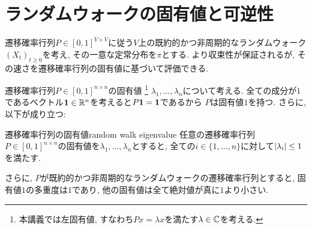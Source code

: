 \section{ランダムウォークの固有値と可逆性}
遷移確率行列$P \in [0,1]^{V \times V}$に従う$V$上の既約的かつ非周期的なランダムウォーク$(X_t)_{t\ge 0}$を考え,
その一意な定常分布を$\pi$とする.
より収束性が保証されるが, その速さを遷移確率行列の固有値に基づいて評価できる.

遷移確率行列$P \in [0,1]^{n \times n}$の固有値
\footnote{本講義では左固有値, すなわち$Px=\lambda x$を満たす$\lambda\in \mathbb{C}$を考える.}
$\lambda_1,\dots,\lambda_n$について考える.
全ての成分が$1$であるベクトル$\mathbf{1}\in \mathbb{R}^n$を考えると$P\mathbf{1} = \mathbf{1}$であるから
$P$は固有値$1$を持つ.
さらに, 以下が成り立つ:
\begin{theorem}{遷移確率行列の固有値}{random walk eigenvalue}
    任意の遷移確率行列$P\in [0,1]^{n\times n}$の固有値を$\lambda_1,\dots,\lambda_n$とすると,
    全ての$i\in\{1,\dots,n\}$に対して$\lvert\lambda_i\rvert \le 1$を満たす.

    さらに, $P$が既約的かつ非周期的なランダムウォークの遷移確率行列とすると,
    固有値$1$の多重度は$1$であり, 他の固有値は全て絶対値が真に$1$より小さい.
\end{theorem}

